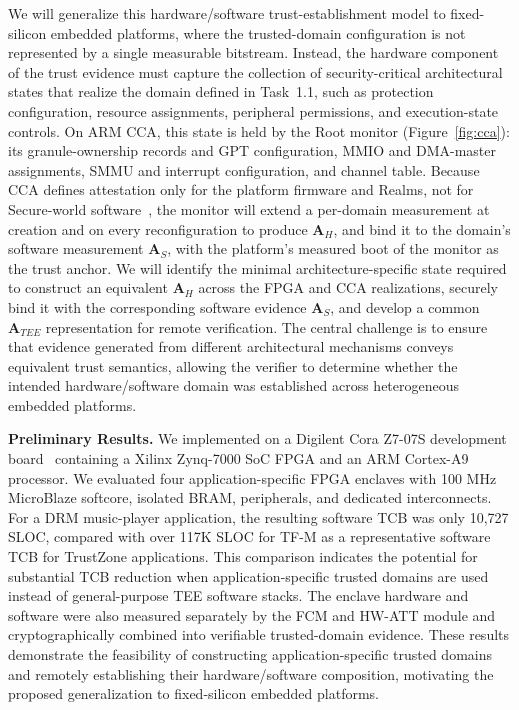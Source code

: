 We will generalize this hardware/software trust-establishment model to fixed-silicon embedded platforms, where the trusted-domain configuration is not represented by a single measurable bitstream.
Instead, the hardware component of the trust evidence must capture the collection of security-critical architectural states that realize the domain defined in Task~1.1, such as protection configuration, resource assignments, peripheral permissions, and execution-state controls.
On ARM CCA, this state is held by the Root monitor (Figure~\ref{fig:cca}): its granule-ownership records and GPT configuration, MMIO and DMA-master assignments, SMMU and interrupt configuration, and channel table.
Because CCA defines attestation only for the platform firmware and Realms, not for Secure-world software~\cite{kuhne2024aster}, the monitor will extend a per-domain measurement at creation and on every reconfiguration to produce $\mathbf{A}_H$, and bind it to the domain's software measurement $\mathbf{A}_S$, with the platform's measured boot of the monitor as the trust anchor.
We will identify the minimal architecture-specific state required to construct an equivalent $\mathbf{A}_H$ across the FPGA and CCA realizations, securely bind it with the corresponding software evidence $\mathbf{A}_S$, and develop a common $\mathbf{A}_{TEE}$ representation for remote verification.
The central challenge is to ensure that evidence generated from different architectural mechanisms conveys equivalent trust semantics, allowing the verifier to determine whether the intended hardware/software domain was established across heterogeneous embedded platforms.


\textbf{Preliminary Results.}
We implemented \byotee on a Digilent Cora Z7-07S development board~\cite{CoraZ7z} containing a Xilinx Zynq-7000 SoC FPGA and an ARM Cortex-A9 processor.
We evaluated four application-specific FPGA enclaves with 100 MHz MicroBlaze softcore, isolated BRAM, peripherals, and dedicated interconnects.
For a DRM music-player application, the resulting software TCB was only 10,727 SLOC, compared with over 117K SLOC for TF-M as a representative software TCB for TrustZone applications.
This comparison indicates the potential for substantial TCB reduction when application-specific trusted domains are used instead of general-purpose TEE software stacks.
The enclave hardware and software were also measured separately by the FCM and HW-ATT module and cryptographically combined into verifiable trusted-domain evidence.
These results demonstrate the feasibility of constructing application-specific trusted domains and remotely establishing their hardware/software composition, motivating the proposed generalization to fixed-silicon embedded platforms.